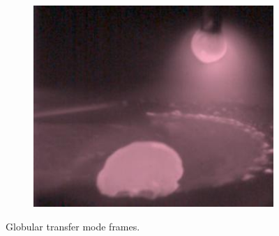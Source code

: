 \begin{figure}
\begin{subfigure}[b]{0.3\textwidth}
    \end{subfigure}
\hfill
    \begin{subfigure}[b]{0.3\textwidth}
        \includegraphics[width=\textwidth]{Images/Dataset/glob_sample_1506.jpg}
        \caption{}
    \end{subfigure}

    \caption[Globular transfer mode frames]{Globular transfer mode frames.}
    \label{fig:glob_samples}
\end{figure}

